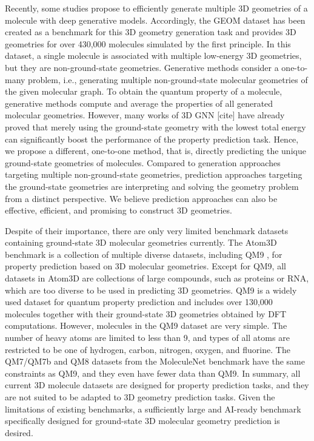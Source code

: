 \documentclass{article}
\begin{document}
Recently, some studies \cite{simm2020generative, mansimov2019molecular, xu2021an, shi2021learning, xu2021learning, ganea2021geomol} propose to efficiently generate multiple 3D geometries of a molecule with deep generative models. Accordingly, the GEOM \cite{axelrod2020geom} dataset has been created as a benchmark for this 3D geometry generation task and provides 3D geometries for over 430,000 molecules simulated by the first principle. In this dataset, a single molecule is associated with multiple low-energy 3D geometries, but they are non-ground-state geometries. Generative methods consider a one-to-many problem, i.e., generating multiple non-ground-state molecular geometries of the given molecular graph. To obtain the quantum property of a molecule, generative methods compute and average the properties of all generated molecular geometries. However, many works of 3D GNN [cite] have already proved that merely using the ground-state geometry with the lowest total energy can significantly boost the performance of the property prediction task. Hence, we propose a different, one-to-one method, that is, directly predicting the unique ground-state geometries of molecules. Compared to generation approaches targeting multiple non-ground-state geometries, prediction approaches targeting the ground-state geometries are interpreting and solving the geometry problem from a distinct perspective. We believe prediction approaches can also be effective, efficient, and promising to construct 3D geometries.



Despite of their importance, there are only very limited benchmark datasets containing ground-state 3D molecular geometries currently. The Atom3D \cite{townshend2020atom3d} benchmark is a collection of multiple diverse datasets, including QM9 \cite{ramakrishnan2014quantum}, for property prediction based on 3D molecular geometries. Except for QM9, all datasets in Atom3D are collections of large compounds, such as proteins or RNA, which are too diverse to be used in predicting 3D geometries. QM9 is a widely used dataset for quantum property prediction and includes over 130,000 molecules together with their ground-state 3D geometries obtained by DFT computations. However, molecules in the QM9 dataset are very simple. The number of heavy atoms are limited to less than 9, and types of all atoms are restricted to be one of hydrogen, carbon, nitrogen, oxygen, and fluorine. The QM7/QM7b and QM8 datasets from the MoleculeNet benchmark have the same constraints as QM9, and they even have fewer data than QM9. In summary, all current 3D molecule datasets are designed for property prediction tasks, and they are not suited to be adapted to 3D geometry prediction tasks. Given the limitations of existing benchmarks, a sufficiently large and AI-ready benchmark specifically designed for ground-state 3D molecular geometry prediction is desired.
\end{document}
